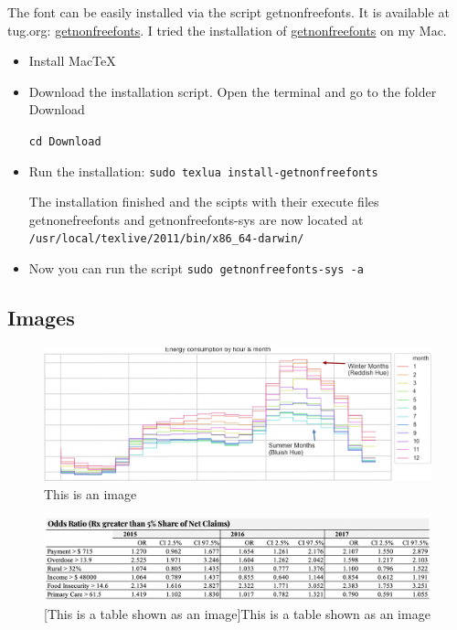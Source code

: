 The font can be easily installed via the script getnonfreefonts. It is available at tug.org: \hyperlink{http://www.tug.org/fonts/getnonfreefonts/}{getnonfreefonts}. I tried the installation of \hyperlink{http://www.tug.org/fonts/getnonfreefonts/install-getnonfreefonts}{getnonfreefonts} on my Mac.

\begin{itemize}
	\item Install MacTeX 
	\item Download the installation script. Open the terminal and go to the folder Download
	
	\texttt{cd Download}
	\item Run the installation: \texttt{sudo texlua install-getnonfreefonts}
	
	The installation finished and the scipts with their execute files getnonefreefonts and getnonfreefonts-sys are now located at \texttt{/usr/local/texlive/2011/bin/x86\_64-darwin/}
	
	\item Now you can run the script \texttt{sudo getnonfreefonts-sys -a}
\end{itemize}

\subsection{Images}
\begin{figure}[!ht]
	\centering
	\includegraphics[width=16cm]{images/testimage1}
	\caption{This is an image}
	\label{fig:testimage1}
\end{figure}

\begin{figure}[!ht]
	\centering
	\includegraphics[width=16cm]{images/testimage2}
	[This is a table shown as an image]{This is a table shown as an image}
	\label{fig:testimage2}
\end{figure}

